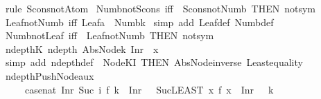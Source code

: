 \begin{isabellebody}
\ {\isacharparenleft}rule\ Scons{\isacharunderscore}not{\isacharunderscore}Atom{\isacharparenright}%
\endisatagproof
{\isafoldproof}%
%
\isadelimproof
\isanewline
%
\endisadelimproof
\isanewline
{}\isamarkupfalse%
\ Numb{\isacharunderscore}not{\isacharunderscore}Scons\ {\isacharbrackleft}iff{\isacharbrackright}\ {\isacharequal}\ Scons{\isacharunderscore}not{\isacharunderscore}Numb\ {\isacharbrackleft}THEN\ not{\isacharunderscore}sym{\isacharbrackright}\isanewline
\isanewline
\isanewline
\isanewline
\isanewline
{}\isamarkupfalse%
\ Leaf{\isacharunderscore}not{\isacharunderscore}Numb\ {\isacharbrackleft}iff{\isacharbrackright}{\isacharcolon}\ {\isachardoublequoteopen}Leaf{\isacharparenleft}a{\isacharparenright}\ {\isasymnoteq}\ Numb{\isacharparenleft}k{\isacharparenright}{\isachardoublequoteclose}\isanewline
%
\isadelimproof
%
\endisadelimproof
%
\isatagproof
{}\isamarkupfalse%
\ {\isacharparenleft}simp\ add{\isacharcolon}\ Leaf{\isacharunderscore}def\ Numb{\isacharunderscore}def{\isacharparenright}%
\endisatagproof
{\isafoldproof}%
%
\isadelimproof
\isanewline
%
\endisadelimproof
\isanewline
{}\isamarkupfalse%
\ Numb{\isacharunderscore}not{\isacharunderscore}Leaf\ {\isacharbrackleft}iff{\isacharbrackright}\ {\isacharequal}\ Leaf{\isacharunderscore}not{\isacharunderscore}Numb\ {\isacharbrackleft}THEN\ not{\isacharunderscore}sym{\isacharbrackright}\isanewline
\isanewline
\isanewline
\isanewline
\isanewline
{}\isamarkupfalse%
\ ndepth{\isacharunderscore}K{}{\isacharcolon}\ {\isachardoublequoteopen}ndepth\ {\isacharparenleft}Abs{\isacharunderscore}Node{\isacharparenleft}{\isacharpercent}k{\isachardot}\ Inr\ {}{\isacharcomma}\ x{\isacharparenright}{\isacharparenright}\ {\isacharequal}\ {}{\isachardoublequoteclose}\isanewline
%
\isadelimproof
%
\endisadelimproof
%
\isatagproof
{}\isamarkupfalse%
\ {\isacharparenleft}simp\ add{\isacharcolon}\ ndepth{\isacharunderscore}def\ \ Node{\isacharunderscore}K{}{\isacharunderscore}I\ {\isacharbrackleft}THEN\ Abs{\isacharunderscore}Node{\isacharunderscore}inverse{\isacharbrackright}\ Least{\isacharunderscore}equality{\isacharparenright}%
\endisatagproof
{\isafoldproof}%
%
\isadelimproof
\isanewline
%
\endisadelimproof
\isanewline
{}\isamarkupfalse%
\ ndepth{\isacharunderscore}Push{\isacharunderscore}Node{\isacharunderscore}aux{\isacharcolon}\isanewline
\ \ \ \ \ {\isachardoublequoteopen}case{\isacharunderscore}nat\ {\isacharparenleft}Inr\ {\isacharparenleft}Suc\ i{\isacharparenright}{\isacharparenright}\ f\ k\ {\isacharequal}\ Inr\ {}\ {\isasymlongrightarrow}\ Suc{\isacharparenleft}LEAST\ x{\isachardot}\ f\ x\ {\isacharequal}\ Inr\ {}{\isacharparenright}\ {\isasymle}\ k{\isachardoublequoteclose}\isanewline

\end{isabellebody}
